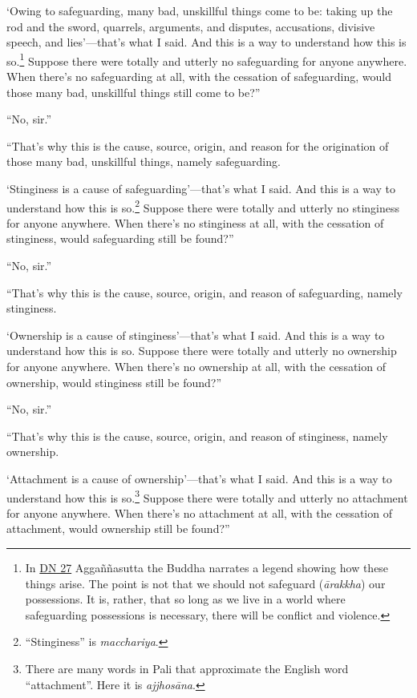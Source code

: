 \documentclass[12pt,openany]{book}%
\begin{document}
‘Owing to safeguarding, many bad, unskillful things come to be: taking up the rod and the sword, quarrels, arguments, and disputes, accusations, divisive speech, and lies’—that’s what I said. And this is a way to understand how this is so.\footnote{In \href{https://suttacentral.net/dn27/en/sujato}{DN 27} \textsanskrit{Aggaññasutta} the Buddha narrates a legend showing how these things arise. The point is not that we should not safeguard (\textit{\textsanskrit{ārakkha}}) our possessions. It is, rather, that so long as we live in a world where safeguarding possessions is necessary, there will be conflict and violence. } Suppose there were totally and utterly no safeguarding for anyone anywhere. When there’s no safeguarding at all, with the cessation of safeguarding, would those many bad, unskillful things still come to be?” 

“No, sir.” 

“That’s why this is the cause, source, origin, and reason for the origination of those many bad, unskillful things, namely safeguarding. 

‘Stinginess is a cause of safeguarding’—that’s what I said. And this is a way to understand how this is so.\footnote{“Stinginess” is \textit{macchariya}. } Suppose there were totally and utterly no stinginess for anyone anywhere. When there’s no stinginess at all, with the cessation of stinginess, would safeguarding still be found?” 

“No, sir.” 

“That’s why this is the cause, source, origin, and reason of safeguarding, namely stinginess. 

‘Ownership is a cause of stinginess’—that’s what I said. And this is a way to understand how this is so. Suppose there were totally and utterly no ownership for anyone anywhere. When there’s no ownership at all, with the cessation of ownership, would stinginess still be found?” 

“No, sir.” 

“That’s why this is the cause, source, origin, and reason of stinginess, namely ownership. 

‘Attachment is a cause of ownership’—that’s what I said. And this is a way to understand how this is so.\footnote{There are many words in Pali that approximate the English word “attachment”. Here it is \textit{\textsanskrit{ajjhosāna}}. } Suppose there were totally and utterly no attachment for anyone anywhere. When there’s no attachment at all, with the cessation of attachment, would ownership still be found?” 
\end{document}
